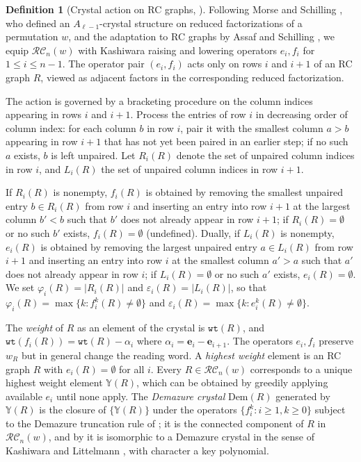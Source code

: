 \documentclass{amsart}
\theoremstyle{definition}
\newtheorem{definition}[lemma]{Definition}
\theoremstyle{remark}
\numberwithin{equation}{subsection}
\newcommand{\wof}[1]{w_{#1}}
\newcommand{\wtt}{\mathtt{wt}}
\newcommand{\RC}{\mathcal{RC}}
\begin{document}
\begin{definition}[Crystal action on RC graphs, {\cite[Definition~\ref*{B-definition:crystal}]{samuelbialgebra}}] \label{definition:crystal}
Following Morse and Schilling \cite{morse2016crystal}, who defined an $A_{\ell-1}$-crystal structure on reduced factorizations of a permutation $w$, and the adaptation to RC graphs by Assaf and Schilling \cite{assaf2018demazure}, we equip $\RC_n(w)$ with Kashiwara raising and lowering operators $e_i, f_i$ for $1\leq i\leq n-1$. The operator pair $(e_i, f_i)$ acts only on rows $i$ and $i+1$ of an RC graph $R$, viewed as adjacent factors in the corresponding reduced factorization.

The action is governed by a bracketing procedure on the column indices appearing in rows $i$ and $i+1$. Process the entries of row $i$ in decreasing order of column index: for each column $b$ in row $i$, pair it with the smallest column $a>b$ appearing in row $i+1$ that has not yet been paired in an earlier step; if no such $a$ exists, $b$ is left unpaired. Let $R_i(R)$ denote the set of unpaired column indices in row $i$, and $L_i(R)$ the set of unpaired column indices in row $i+1$.

If $R_i(R)$ is nonempty, $f_i(R)$ is obtained by removing the smallest unpaired entry $b\in R_i(R)$ from row $i$ and inserting an entry into row $i+1$ at the largest column $b' < b$ such that $b'$ does not already appear in row $i+1$; if $R_i(R) = \emptyset$ or no such $b'$ exists, $f_i(R) = \emptyset$ (undefined). Dually, if $L_i(R)$ is nonempty, $e_i(R)$ is obtained by removing the largest unpaired entry $a\in L_i(R)$ from row $i+1$ and inserting an entry into row $i$ at the smallest column $a' > a$ such that $a'$ does not already appear in row $i$; if $L_i(R) = \emptyset$ or no such $a'$ exists, $e_i(R) = \emptyset$. We set $\varphi_i(R)=|R_i(R)|$ and $\varepsilon_i(R)=|L_i(R)|$, so that $\varphi_i(R)=\max\{k: f_i^k(R)\neq\emptyset\}$ and $\varepsilon_i(R)=\max\{k:e_i^k(R)\neq\emptyset\}$.

The \emph{weight} of $R$ as an element of the crystal is $\wtt(R)$, and $\wtt(f_i(R))=\wtt(R)-\alpha_i$ where $\alpha_i=\mathbf{e}_i-\mathbf{e}_{i+1}$. The operators $e_i,f_i$ preserve $\wof{R}$ but in general change the reading word. A \emph{highest weight} element is an RC graph $R$ with $e_i(R) = \emptyset$ for all $i$. Every $R\in \RC_n(w)$ corresponds to a unique highest weight element $\mathbb{Y}(R)$, which can be obtained by greedily applying available $e_i$ until none apply. The \emph{Demazure crystal} $\mathrm{Dem}(R)$ generated by $\mathbb{Y}(R)$ is the closure of $\{\mathbb{Y}(R)\}$ under the operators $\{f_i^k : i\geq 1, k\geq 0\}$ subject to the Demazure truncation rule of \cite{assaf2018demazure}; it is the connected component of $R$ in $\RC_n(w)$, and by \cite{assaf2018demazure} it is isomorphic to a Demazure crystal in the sense of Kashiwara \cite{kashiwara1993crystal} and Littelmann \cite{littelmann1995crystal}, with character a key polynomial.
\end{definition}
\end{document}
